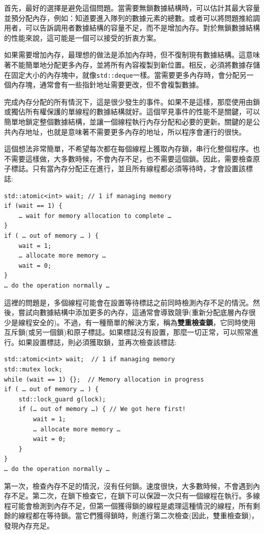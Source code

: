 首先，最好的選擇是避免這個問題。當需要無鎖數據結構時，可以估計其最大容量並預分配內存，例如：知道要進入隊列的數據元素的總數。或者可以將問題推給調用者，可以告訴調用者數據結構的容量不足，而不是增加內存。對於無鎖數據結構的性能來說，這可能是一個可以接受的折衷方案。

如果需要增加內存，最理想的做法是添加內存時，但不復制現有數據結構。這意味著不能簡單地分配更多內存，並將所有內容複製到新位置。相反，必須將數據存儲在固定大小的內存塊中，就像\texttt{std::deque}一樣。當需要更多內存時，會分配另一個內存塊，通常會有一些指針地址需要更改，但不會複製數據。

完成內存分配的所有情況下，這是很少發生的事件。如果不是這樣，那麼使用由鎖或獨佔所有權保護的單線程的數據結構就好。這個罕見事件的性能不是關鍵，可以簡單地鎖定整個數據結構，並讓一個線程執行內存分配和必要的更新。關鍵的是公共內存地址，也就是意味著不需要更多內存的地址，所以程序會運行的很快。

這個想法非常簡單，不希望每次都在每個線程上獲取內存鎖，串行化整個程序。也不需要這樣做，大多數時候，不會內存不足，也不需要這個鎖。因此，需要檢查原子標誌。只有當內存分配正在進行，並且所有線程都必須等待時，才會設置該標誌:

\begin{lstlisting}[style=styleCXX]
std::atomic<int> wait; // 1 if managing memory
if (wait == 1) {
	… wait for memory allocation to complete …
}
if ( … out of memory … ) {
	wait = 1;
	… allocate more memory …
	wait = 0;
}
… do the operation normally … 
\end{lstlisting}

這裡的問題是，多個線程可能會在設置等待標誌之前同時檢測內存不足的情況。然後，嘗試向數據結構中添加更多的內存，這通常會導致競爭(重新分配底層內存很少是線程安全的)。不過，有一種簡單的解決方案，稱為\textbf{雙重檢查鎖}，它同時使用互斥鎖(或另一個鎖)和原子標誌。如果標誌沒有設置，那麼一切正常，可以照常進行。如果設置標誌，則必須獲取鎖，並再次檢查該標誌:

\begin{lstlisting}[style=styleCXX]
std::atomic<int> wait;  // 1 if managing memory
std::mutex lock;
while (wait == 1) {};  // Memory allocation in progress
if ( … out of memory … ) {
	std::lock_guard g(lock);
	if (… out of memory …) { // We got here first!
		wait = 1;
		… allocate more memory …
		wait = 0;
	}
}
… do the operation normally …
\end{lstlisting}

第一次，檢查內存不足的情況，沒有任何鎖。速度很快，大多數時候，不會遇到內存不足。第二次，在鎖下檢查它，在鎖下可以保證一次只有一個線程在執行。多線程可能會檢測到內存不足，但第一個獲得鎖的線程是處理這種情況的線程，所有剩餘的線程都在等待鎖。當它們獲得鎖時，則進行第二次檢查(因此，雙重檢查鎖)，發現內存充足。

